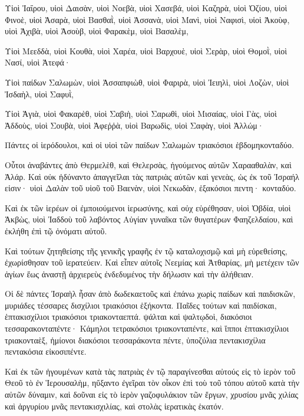 {\par }{\PP {}Υἱοὶ Ἰαΐρου, υἱοὶ Δαισὰν, υἱοὶ Νοεβὰ, υἱοὶ Χασεβά, υἱοὶ Καζηρὰ, υἱοὶ Ὀζίου, υἱοὶ Φινοὲ, υἱοὶ Ἀσαρὰ, υἱοὶ Βασθαῒ, υἱοὶ Ἀσσανὰ, υἱοὶ Μανὶ, υἱοὶ Ναφισὶ, υἱοὶ Ἀκοὺφ, υἱοὶ Ἀχιβὰ, υἱοὶ Ἀσοὺβ, υἱοὶ Φαρακὲμ, υἱοὶ Βασαλὲμ,
\par }{\PP {}Υἱοὶ Μεεδδὰ, υἱοὶ Κουθὰ, υἱοὶ Χαρέα, υἱοὶ Βαρχουὲ, υἱοὶ Σερὰρ, υἱοὶ Θομοῒ, υἱοὶ Νασί, υἱοὶ Ἀτεφά·
\par }{\PP {}Υἱοὶ παίδων Σαλωμὼν, υἱοὶ Ἀσσαπφιὼθ, υἱοὶ Φαριρὰ, υἱοὶ Ἰειηλὶ, υἱοὶ Λοζὼν, υἱοὶ Ἰσδαὴλ, υἱοὶ Σαφυῒ,
\par }{\PP {}Υἱοὶ Ἁγιὰ, υἱοὶ Φακαρὲθ, υἱοὶ Σαβιὴ, υἱοὶ Σαρωθὶ, υἱοὶ Μισαίας, υἱοὶ Γὰς, υἱοὶ Ἀδδοὺς, υἱοὶ Σουβὰ, υἱοὶ Ἀφεῤῥὰ, υἱοὶ Βαρωδὶς, υἱοὶ Σαφὰγ, υἱοὶ Ἀλλώμ·
\par }{\PP {}Πάντες οἱ ἱερόδουλοι, καὶ οἱ υἱοὶ τῶν παίδων Σαλωμὼν τριακόσιοι ἑβδομηκονταδύο.
\par }{\PP {}Οὗτοι ἀναβάντες ἀπὸ Θερμελὲθ, καὶ Θελερσὰς, ἡγούμενος αὐτῶν Χαρααθαλὰν, καὶ Ἀλάρ.
Καὶ οὐκ ἠδύναντο ἀπαγγεῖλαι τὰς πατριὰς αὐτῶν καὶ γενεὰς, ὡς ἐκ τοῦ Ἰσραήλ εἰσιν· υἱοὶ Δαλὰν τοῦ υἱοῦ τοῦ Βαενὰν, υἱοὶ Νεκωδὰν, ἑξακόσιοι πεντη· κονταδύο.
\par }{\PP {}Καὶ ἐκ τῶν ἱερέων οἱ ἐμποιούμενοι ἱερωσύνης, καὶ οὐχ εὑρέθησαν, υἱοὶ Ὀβδία, υἱοὶ Ἁκβὼς, υἱοὶ Ἰαδδοὺ τοῦ λαβόντος Αὐγίαν γυναῖκα τῶν θυγατέρων Φαηζελδαίου, καὶ ἐκλήθη ἐπὶ τῷ ὀνόματι αὐτοῦ.
\par }{\PP {}Καὶ τούτων ζητηθείσης τῆς γενικῆς γραφῆς ἐν τῷ καταλοχισμῷ καὶ μὴ εὑρεθείσης, ἐχωρίσθησαν τοῦ ἱερατεύειν.
Καὶ εἶπεν αὐτοῖς Νεεμίας καὶ Ἀτθαρίας, μὴ μετέχειν τῶν ἁγίων ἕως ἀναστῇ ἀρχιερεὺς ἐνδεδυμένος τὴν δήλωσιν καὶ τὴν ἀλήθειαν.
\par }{\PP {}Οἱ δὲ πάντες Ἰσραὴλ ἦσαν ἀπὸ δωδεκαετοῦς καὶ ἐπάνω χωρὶς παίδων καὶ παιδισκῶν, μυριάδες τέσσαρες δισχίλιοι τριακόσιοι ἑξήκοντα.
Παῖδες τούτων καὶ παιδίσκαι, ἑπτακισχίλιοι τριακόσιοι τριακονταεπτά. ψάλται καὶ ψαλτῳδοὶ, διακόσιοι τεσσαρακονταπέντε·
Κάμηλοι τετρακόσιοι τριακονταπέντε, καὶ ἵπποι ἑπτακισχίλιοι τριακονταὲξ, ἡμίονοι διακόσιοι τεσσαράκοντα πέντε, ὑποζύλια πεντακισχίλια πεντακόσια εἰκοσιπέντε.
\par }{\PP {}Καὶ ἐκ τῶν ἡγουμένων κατὰ τὰς πατριὰς ἐν τῷ παραγίνεσθαι αὐτούς εἰς τὸ ἱερὸν τοῦ Θεοῦ τὸ ἐν Ἱερουσαλὴμ, ηὔξαντο ἐγεῖραι τὸν οἶκον ἐπὶ τοὺ τοῦ τόπου αὐτοῦ κατὰ τὴν αὐτῶν δύναμιν,
καὶ δοῦναι εἰς τὸ ἱερὸν γαζοφυλάκιον τῶν ἔργων, χρυσίου μνᾶς χιλίας καὶ ἀργυρίου μνᾶς πεντακισχιλίας, καὶ στολὰς ἱερατικὰς ἑκατόν.
}
